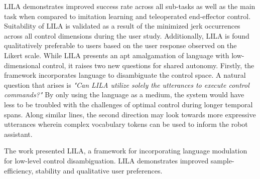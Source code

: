 \documentclass[12pt,letterpaper]{article}
\begin{document}
LILA demonstrates improved success rate across all sub-tasks as well as the main task when compared to imitation learning and teleoperated end-effector control. Suitability of LILA is validated as a result of the minimized jerk occurrences across all control dimensions during the user study. Additionally, LILA is found qualitatively preferable to users based on the user response observed on the Likert scale. While LILA presents an apt amalgamation of language with low-dimensional control, it raises two new questions for shared autonomy. Firstly, the framework incorporates language to disambiguate the control space. A natural question that arises is \textit{"Can LILA utilize solely the utterances to execute control commands?"} By only using the language as a medium, the system would have less to be troubled with the challenges of optimal control during longer temporal spans. Along similar lines, the second direction may look towards more expressive utterances wherein complex vocabulary tokens can be used to inform the robot assistant.

The work presented LILA, a framework for incorporating language modulation for low-level control disambiguation. LILA demonstrates improved sample-efficiency, stability and qualitative user preferences.
\end{document}
